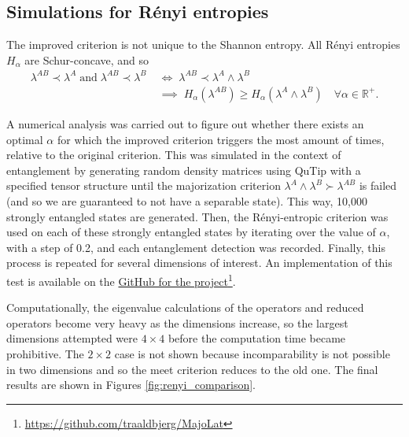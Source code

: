 \subsection{Simulations for R\'enyi entropies}

The improved criterion is not unique to the Shannon entropy. All Rényi entropies $H_\alpha$ are Schur-concave, and so
\begin{align}
    \lambda^{AB} \prec \lambda^A \; \text{and} \; \lambda^{AB} \prec \lambda^{B} \; &\iff \; \lambda^{AB} \prec \lambda^A \wedge \lambda^B \;\\ &\implies \; H_\alpha(\lambda^{AB}) \geq H_\alpha(\lambda^A \wedge \lambda^B) \quad \forall \alpha \in \mathbb{R}^+.
\end{align}

A numerical analysis was carried out to figure out whether there exists an optimal $\alpha$ for which the improved criterion triggers the most amount of times, relative to the original criterion. This was simulated in the context of entanglement by generating random density matrices using QuTip with a specified tensor structure until the majorization criterion $\lambda^A \wedge \lambda^B \succ \lambda^{AB}$ is failed (and so we are guaranteed to not have a separable state). This way, 10,000 strongly entangled states are generated. Then, the Rényi-entropic criterion was used on each of these strongly entangled states by iterating over the value of $\alpha$, with a step of 0.2, and each entanglement detection was recorded. Finally, this process is repeated for several dimensions of interest. An implementation of this test is available on the \href{https://github.com/traaldbjerg/MajoLat}{GitHub for the project}\footnote{\url{https://github.com/traaldbjerg/MajoLat}}.

Computationally, the eigenvalue calculations of the operators and reduced operators become very heavy as the dimensions increase, so the largest dimensions attempted were $4 \times 4$ before the computation time became prohibitive. The $2 \times 2$ case is not shown because incomparability is not possible in two dimensions and so the meet criterion reduces to the old one. The final results are shown in Figures \ref{fig:renyi_comparison}.

